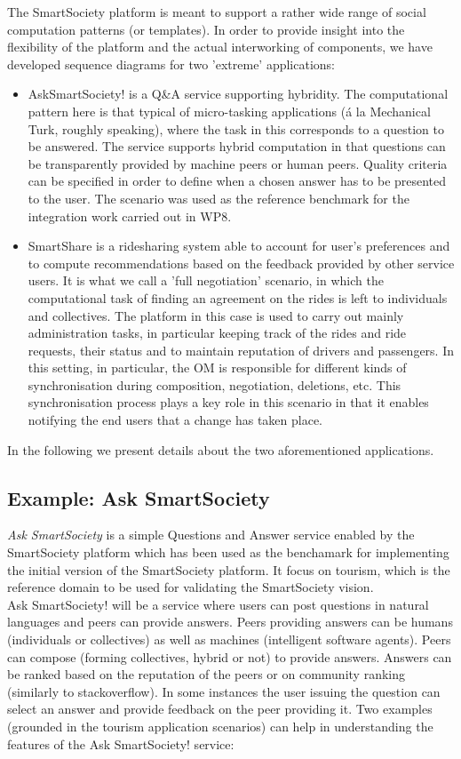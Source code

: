 The SmartSociety platform is meant to support a rather wide range of
social computation patterns (or templates). In order to provide
insight into the flexibility of the platform and the actual
interworking of components, we have developed sequence diagrams for two
'extreme' applications:
\begin{itemize}
\item AskSmartSociety! is a Q\&A service supporting hybridity. The
computational pattern here is that typical of micro-tasking
applications (\'a la Mechanical Turk, roughly speaking), where the
task in this corresponds to a question to be answered. The service
supports hybrid computation in that questions can be transparently
provided by machine peers or human peers. Quality criteria can be
specified in order to define when a chosen answer has to be presented
to the user. The scenario was used as the reference benchmark for the integration work carried out in WP8.

\item SmartShare is a ridesharing system able to account for user's
preferences and to compute recommendations based on the feedback
provided by other service users. It is what we call a 'full
negotiation' scenario, in which the computational task of finding an
agreement on the rides is left to individuals and collectives. The
platform in this case is used to carry out mainly administration tasks, in
particular keeping track of the rides and ride requests, their status
and to maintain reputation of drivers and passengers. In this setting, in particular, the OM is responsible for different kinds of synchronisation during composition, negotiation, deletions, etc. This synchronisation process plays a key role in this scenario in that it enables notifying the end users that a change has taken place. 
\end{itemize}
In the following we present details about the two aforementioned
applications. 


\subsection{Example: Ask SmartSociety}\label{sec:asksmartsoc}
\textit{Ask SmartSociety} is a simple Questions and Answer service enabled by the SmartSociety platform which has been used as the benchamark for implementing the initial version of the SmartSociety platform. It focus on tourism, which is the reference domain to be used for validating the SmartSociety vision.\\
Ask SmartSociety! will be a service where users can post questions in natural languages and peers can provide answers. Peers providing answers can be humans (individuals or collectives) as well as machines (intelligent software agents). Peers can compose (forming collectives, hybrid or not) to provide answers. Answers can be ranked based on the reputation of the peers or on community ranking (similarly to stackoverflow). In some instances the user issuing the question can select an answer and provide feedback on the peer providing it.
Two examples (grounded in the tourism application scenarios) can help in understanding the features of the Ask SmartSociety! service:


